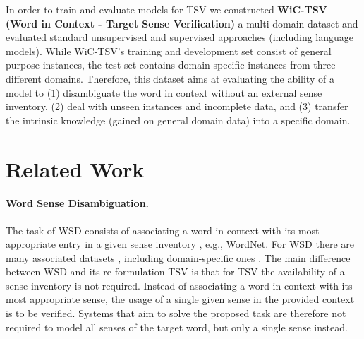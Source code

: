 \documentclass[11pt,a4paper]{article}
\begin{document}
In order to train and evaluate models for TSV we constructed \textbf{WiC-TSV (Word in Context - Target Sense Verification)} a multi-domain dataset and evaluated standard unsupervised and supervised approaches (including language models). While WiC-TSV's training and development set consist of general purpose instances, the test set contains domain-specific instances from three different domains. Therefore, this dataset aims at evaluating the ability of a model to (1) disambiguate the word in context without an external sense inventory, (2)  deal with unseen instances and incomplete data, and (3) transfer the intrinsic knowledge (gained on general domain data) into a specific domain.

\begin{comment}
\section{Motivation}
TO ADD IN CONFERENCE SUBMISSION

Main thread:
WSD not useful on its own
This task useful practically - IR, data mining, etc.
Evaluation on specific domains - more realistic
\magenta{Goal mentioned in the description of the benchmark: A goal of this challenge is to enable the usage of domain-specific enterprise knowledge graphs for the processing of large volumes of diverse textual data. ... and also ...  Another model quality that is aimed at with the presented benchmark is the ability to transfer the intrinsic knowledge into a specific domain. As for most areas, domain-specific training data is hard to obtain, being able to learn on general purpose data and still perform well on domain-specific data is a huge advantage in a real world setting}
\end{comment}


\section{Related Work}
\label{related_work}

\paragraph{Word Sense Disambiguation.} 
The task of WSD consists of associating a word in context with its most appropriate entry in a given sense inventory \cite{navigli:09}, e.g., WordNet. For WSD there are many associated datasets \cite{raganato-camachocollados-navigli:2017:EACLlong,vialetal:18,Roder2018,ling-etal-2015-design}, including domain-specific ones \cite{agirre-etal-2009-semeval,faralli-navigli-2012-new}. The main difference between WSD and its re-formulation TSV is that for TSV the availability of a sense inventory is not required. Instead of associating a word in context with its most appropriate sense, the usage of a single given sense in the provided context is to be verified. Systems that aim to solve the proposed task are therefore not required to model all senses of the target word, but only a single sense instead.
\end{document}
